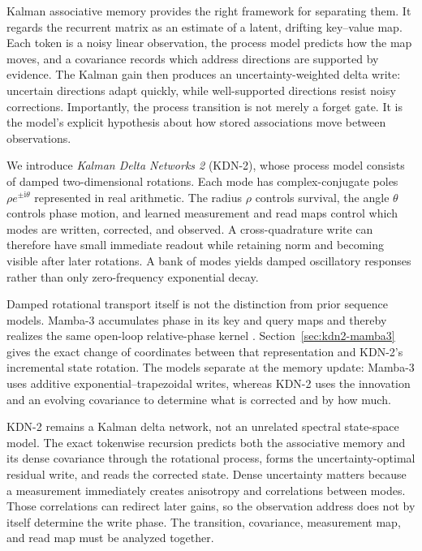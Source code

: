\documentclass[11pt,letterpaper,logo]{yalearxiv}
\begin{document}
Kalman associative memory provides the right framework for separating them. It regards the
recurrent matrix as an estimate of a latent, drifting key--value map. Each token is a noisy linear
observation, the process model predicts how the map moves, and a covariance records which address
directions are supported by evidence. The Kalman gain then produces an uncertainty-weighted delta
write: uncertain directions adapt quickly, while well-supported directions resist noisy
corrections. Importantly, the process transition is not merely a forget gate. It is the model's
explicit hypothesis about how stored associations move between observations.

We introduce \emph{Kalman Delta Networks 2} (KDN-2), whose process model consists of damped
two-dimensional rotations. Each mode has complex-conjugate poles
$\rho e^{\pm\mathrm{i}\theta}$ represented in real arithmetic. The radius $\rho$ controls
survival, the angle $\theta$ controls phase motion, and learned measurement and read maps control
which modes are written, corrected, and observed. A cross-quadrature write can therefore have
small immediate readout while retaining norm and becoming visible after later rotations. A bank of
modes yields damped oscillatory responses rather than only zero-frequency exponential decay.

Damped rotational transport itself is not the distinction from prior sequence models. Mamba-3
accumulates phase in its key and query maps and thereby realizes the same open-loop relative-phase
kernel \citep{lahoti2026mamba3}. Section~\ref{sec:kdn2-mamba3} gives the exact change of
coordinates between that representation and KDN-2's incremental state rotation. The models
separate at the memory update: Mamba-3 uses additive exponential--trapezoidal writes, whereas
KDN-2 uses the innovation and an evolving covariance to determine what is corrected and by how
much.

KDN-2 remains a Kalman delta network, not an unrelated spectral state-space model. The exact
tokenwise recursion predicts both the associative memory and its dense covariance through the
rotational process, forms the uncertainty-optimal residual write, and reads the corrected state.
Dense uncertainty matters because a measurement immediately creates anisotropy and correlations
between modes. Those correlations can redirect later gains, so the observation address does not
by itself determine the write phase. The transition, covariance, measurement map, and read map
must be analyzed together.
\end{document}
